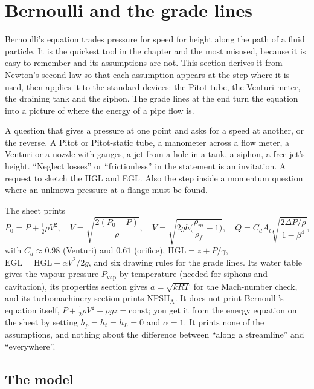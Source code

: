 \section{Bernoulli and the grade lines}
\label{sec:bernoulli}

Bernoulli's equation trades pressure for speed for height along the path of a fluid particle. It is the quickest tool in the chapter and the most misused, because it is easy to remember and its assumptions are not. This section derives it from Newton's second law so that each assumption appears at the step where it is used, then applies it to the standard devices: the Pitot tube, the Venturi meter, the draining tank and the siphon. The grade lines at the end turn the equation into a picture of where the energy of a pipe flow is.

\begin{recognise}
A question that gives a pressure at one point and asks for a speed at another, or the reverse. A Pitot or Pitot-static tube, a manometer across a flow meter, a Venturi or a nozzle with gauges, a jet from a hole in a tank, a siphon, a free jet's height. ``Neglect losses'' or ``frictionless'' in the statement is an invitation. A request to sketch the HGL and EGL. Also the step inside a momentum question where an unknown pressure at a flange must be found.
\end{recognise}

\begin{onsheet}
The sheet prints
\[
P_0 = P + \tfrac12\rho V^2,\quad V = \sqrt{\frac{2(P_0 - P)}{\rho}},\quad V = \sqrt{2gh\Big(\frac{\rho_m}{\rho_f} - 1\Big)},\quad Q = C_dA_t\sqrt{\frac{2\Delta P/\rho}{1 - \beta^4}},
\]
with $C_d \approx 0.98$ (Venturi) and $0.61$ (orifice), $\mathrm{HGL} = z + P/\gamma$, $\mathrm{EGL} = \mathrm{HGL} + \alpha V^2/2g$, and six drawing rules for the grade lines. Its water table gives the vapour pressure $P_\text{vap}$ by temperature (needed for siphons and cavitation), its properties section gives $a = \sqrt{kRT}$ for the Mach-number check, and its turbomachinery section prints $\mathrm{NPSH_A}$. It does not print Bernoulli's equation itself, $P + \tfrac12\rho V^2 + \rho gz = \text{const}$; you get it from the energy equation on the sheet by setting $h_p = h_t = h_L = 0$ and $\alpha = 1$. It prints none of the assumptions, and nothing about the difference between ``along a streamline'' and ``everywhere''.
\end{onsheet}

\subsection*{The model}

